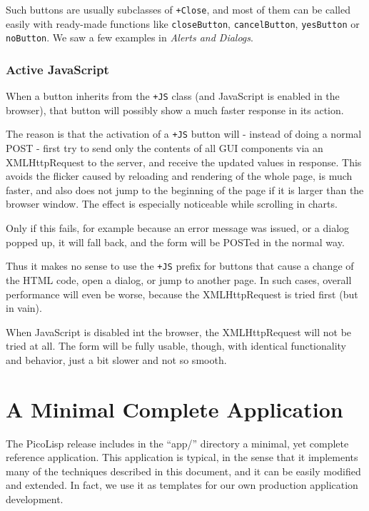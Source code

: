 Such buttons are usually subclasses of \texttt{+Close}, and most of them can be
called easily with ready-made functions like \texttt{closeButton},
\texttt{cancelButton}, \texttt{yesButton} or \texttt{noButton}. We saw a few examples in
\emph{Alerts and Dialogs}.

 


\subsubsection{ Active JavaScript}
\label{sec:appl-devel-active-javascript}%

When a button inherits from the \texttt{+JS} class (and JavaScript is enabled
in the browser), that button will possibly show a much faster response
in its action.

The reason is that the activation of a \texttt{+JS} button will - instead of
doing a normal POST - first try to send only the contents of all GUI
components via an XMLHttpRequest to the server, and receive the updated
values in response. This avoids the flicker caused by reloading and
rendering of the whole page, is much faster, and also does not jump to
the beginning of the page if it is larger than the browser window. The
effect is especially noticeable while scrolling in charts.

Only if this fails, for example because an error message was issued, or
a dialog popped up, it will fall back, and the form will be POSTed in
the normal way.

Thus it makes no sense to use the \texttt{+JS} prefix for buttons that cause a
change of the HTML code, open a dialog, or jump to another page. In such
cases, overall performance will even be worse, because the
XMLHttpRequest is tried first (but in vain).

When JavaScript is disabled int the browser, the XMLHttpRequest will not
be tried at all. The form will be fully usable, though, with identical
functionality and behavior, just a bit slower and not so smooth.

\section{A Minimal Complete Application}
\label{sec:appl-devel-a-minimal-complete-application}

The PicoLisp release includes in the ``app/'' directory a minimal, yet
complete reference application. This application is typical, in the
sense that it implements many of the techniques described in this
document, and it can be easily modified and extended. In fact, we use it
as templates for our own production application development.

